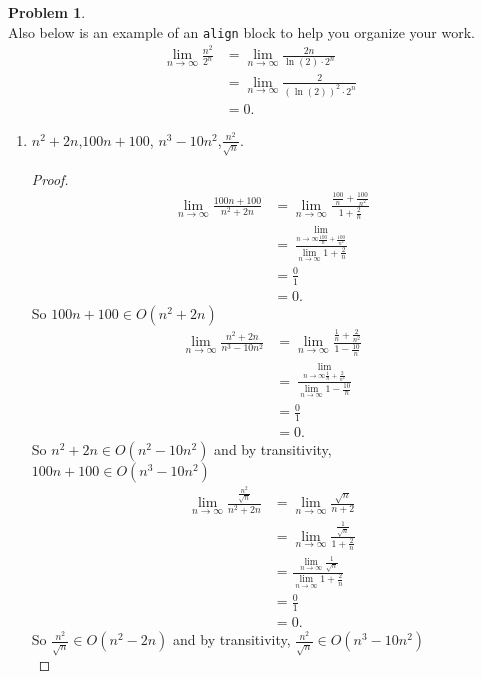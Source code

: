\documentclass[11pt]{article}
\theoremstyle{definition}
\theoremstyle{definition}
\newtheorem{required}{Problem}
\theoremstyle{definition}
\begin{document}
\begin{required}
\noindent \\ Also below is an example of an \texttt{align} block to help you organize your work.
\begin{align*}
\lim_{n \to \infty} \frac{n^{2}}{2^{n}} &= \lim_{n \to \infty} \frac{2n}{\ln(2) \cdot 2^{n}} \\
&= \lim_{n \to \infty} \frac{2}{(\ln(2))^{2} \cdot 2^{n}} \\
&= 0.
\end{align*}
\newpage
\begin{enumerate} [label=(\alph*)]
\subsection{Problem 1\ref{1a} (2 points)}
    \item \label{1a} $ n^2+2n$,\qquad  $100n+100$, \qquad $n^3-10n^2$,\qquad  $\frac{n^2}{\sqrt{n}}$.
    \begin{proof}
    	\begin{align*}
    		\lim_{n \to \infty} \frac{100n + 100}{n^{2} + 2n} &= \lim_{n \to \infty} \frac{\frac{100}{n} + \frac{100}{n^2}}{1 + \frac{2}{n}} \\
    		&= \frac{\lim_{n \to \infty \frac{100}{n} + \frac{100}{n^2}}}{\lim_{n \to \infty} 1 + \frac{2}{n}} \\
    		&= \frac{0}{1} \\
    		&= 0.
    	\end{align*}
    So $100n+100 \in O(n^2+2n)$\\
    \begin{align*}
    	\lim_{n \to \infty} \frac{n^{2}+2n}{n^{3} - 10n^2} &= \lim_{n \to \infty} \frac{\frac{1}{n} + \frac{2}{n^2}}{1 - \frac{10}{n}} \\
    	&= \frac{\lim_{n \to \infty \frac{1}{n} + \frac{2}{n^2}}}{\lim_{n \to \infty} 1 - \frac{10}{n}} \\
    	&= \frac{0}{1} \\
    	&= 0.
    \end{align*}
 So $n^2 + 2n \in O(n^{2} - 10n^2)$ and by transitivity, $100n + 100 \in O(n^{3} - 10n^2)$\\
    \begin{align*}
	\lim_{n \to \infty} \frac{\frac{n^2}{\sqrt{n}}}{n^{2} + 2n} &= \lim_{n \to \infty} \frac{\sqrt{n}}{n + 2}\\
	&= \lim_{n \to \infty} \frac{\frac{1}{\sqrt{n}}}{1 + \frac{2}{n}} \\
	&= \frac{\lim_{n \to \infty}\frac{1}{\sqrt{n}}}{\lim_{n \to \infty}1 + \frac{2}{n}}\\
	&= \frac{0}{1} \\
	&= 0.
\end{align*}
 So $\frac{n^2}{\sqrt{n}} \in O(n^{2} - 2n)$ and by transitivity, $\frac{n^2}{\sqrt{n }} \in O(n^{3} - 10n^2)$\\
 

\end{proof}
\end{enumerate}
\end{required}
\end{document}
